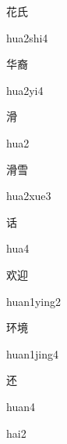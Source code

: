 \begin{multicols*}{2}
\begin{verbete}{花氏}
\begin{pronuncia}{hua2shi4}
\end{pronuncia}
\end{verbete}

\begin{verbete}[hua2yi4]{华裔}
\begin{pronuncia}{hua2yi4}
\end{pronuncia}
\end{verbete}

\begin{verbete}[hua2]{滑}
\begin{pronuncia}{hua2}
\end{pronuncia}
\end{verbete}

\begin{verbete}{滑雪}
\begin{pronuncia}{hua2xue3}
\end{pronuncia}
\end{verbete}

\begin{verbete}[hua4]{话}
\begin{pronuncia}{hua4}
\end{pronuncia}
\end{verbete}

\begin{verbete}{欢迎}
\begin{pronuncia}{huan1ying2}
\end{pronuncia}
\end{verbete}

\begin{verbete}{环境}
\begin{pronuncia}{huan1jing4}
\end{pronuncia}
\end{verbete}

\begin{verbete}[huan4]{还}
\begin{pronuncia}{huan4}
\end{pronuncia}
\begin{pronuncia}{hai2}
\end{pronuncia}
\end{verbete}


\end{multicols*}
